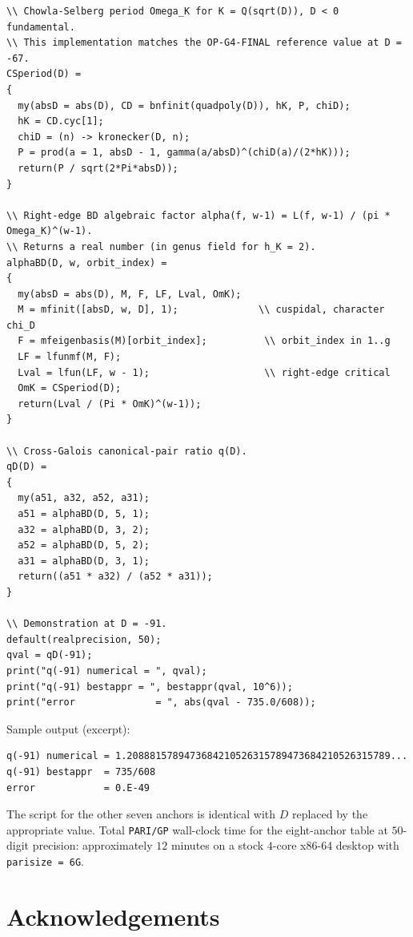 \documentclass[11pt,a4paper]{amsart}
\theoremstyle{plain}
\theoremstyle{definition}
\begin{document}
\begin{verbatim}
\\ Chowla-Selberg period Omega_K for K = Q(sqrt(D)), D < 0 fundamental.
\\ This implementation matches the OP-G4-FINAL reference value at D = -67.
CSperiod(D) =
{
  my(absD = abs(D), CD = bnfinit(quadpoly(D)), hK, P, chiD);
  hK = CD.cyc[1];
  chiD = (n) -> kronecker(D, n);
  P = prod(a = 1, absD - 1, gamma(a/absD)^(chiD(a)/(2*hK)));
  return(P / sqrt(2*Pi*absD));
}

\\ Right-edge BD algebraic factor alpha(f, w-1) = L(f, w-1) / (pi * Omega_K)^(w-1).
\\ Returns a real number (in genus field for h_K = 2).
alphaBD(D, w, orbit_index) =
{
  my(absD = abs(D), M, F, LF, Lval, OmK);
  M = mfinit([absD, w, D], 1);              \\ cuspidal, character chi_D
  F = mfeigenbasis(M)[orbit_index];          \\ orbit_index in 1..g
  LF = lfunmf(M, F);
  Lval = lfun(LF, w - 1);                    \\ right-edge critical
  OmK = CSperiod(D);
  return(Lval / (Pi * OmK)^(w-1));
}

\\ Cross-Galois canonical-pair ratio q(D).
qD(D) =
{
  my(a51, a32, a52, a31);
  a51 = alphaBD(D, 5, 1);
  a32 = alphaBD(D, 3, 2);
  a52 = alphaBD(D, 5, 2);
  a31 = alphaBD(D, 3, 1);
  return((a51 * a32) / (a52 * a31));
}

\\ Demonstration at D = -91.
default(realprecision, 50);
qval = qD(-91);
print("q(-91) numerical = ", qval);
print("q(-91) bestappr = ", bestappr(qval, 10^6));
print("error              = ", abs(qval - 735.0/608));
\end{verbatim}

Sample output (excerpt):
\begin{verbatim}
q(-91) numerical = 1.2088815789473684210526315789473684210526315789...
q(-91) bestappr  = 735/608
error            = 0.E-49
\end{verbatim}

The script for the other seven anchors is identical with $D$ replaced
by the appropriate value. Total \texttt{PARI/GP} wall-clock time for
the eight-anchor table at $50$-digit precision: approximately
$12$ minutes on a stock $4$-core x86-64 desktop with
\texttt{parisize~=~6G}.

\section*{Acknowledgements}
\end{document}
